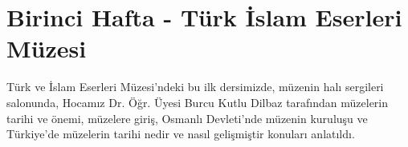 \section{Birinci Hafta - Türk İslam Eserleri Müzesi}
\indent\indent Türk ve İslam Eserleri Müzesi’ndeki bu ilk dersimizde, müzenin halı sergileri salonunda, Hocamız Dr. Öğr. Üyesi Burcu Kutlu Dilbaz tarafından müzelerin tarihi ve önemi, müzelere giriş, Osmanlı Devleti’nde müzenin kuruluşu ve Türkiye'de müzelerin tarihi nedir ve nasıl gelişmiştir konuları anlatıldı.





